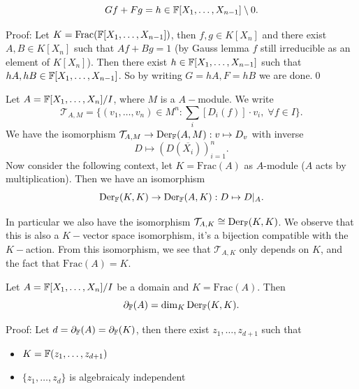 \begin{itemize}
\begin{corollary}
    \begin{equation}
        Gf + Fg = h\in \mathbb{F}[X_1,\dots,X_{n-1}]\setminus0.
    \end{equation}
  \end{corollary}
  Proof: Let $K=\text{Frac}(\mathbb{F}[X_1,\dots,X_{n-1}])$, then $f,g\in K[X_n]$ and there exist 
  $A,B\in K[X_n]$ such that $Af + Bg = 1$ (by Gauss lemma $f$ still irreducible as an element of 
  $K[X_n]$). Then there exist $h\in \mathbb{F}[X_1,\dots,X_{n-1}]$ such that 
  $hA, hB\in \mathbb{F}[X_1,\dots,X_{n-1}]$. So by writing $G=hA, F =hB$ we are done.\qed
  \begin{notation}
    Let $A=\mathbb{F}[X_1,\dots,X_n]/I$, where $M$ is a $A-$module. We write 
    \begin{equation}
        \mathcal{T}_{A,M}=\{(v_1,\dots,v_n)\in M^n:\sum_i[D_i(f)]\cdot v_i,\;\forall f\in I\}.
    \end{equation}
    We have the isomorphism $\mathcal{T}_{A,M}\to \text{Der}_{\mathbb{F}}(A,M): v\mapsto D_v$ with inverse 
    \begin{equation}
        D\mapsto (D(\overline{X_i}))_{i=1}^n.
    \end{equation}
    Now consider the following context, let 
    $K=\text{Frac}(A)$ as $A$-module ($A$ acts by multiplication). Then we have an isomorphism
    \begin{equation}
        \text{Der}_{\mathbb{F}}(K,K)\to \text{Der}_{\mathbb{F}}(A,K):D\mapsto D|_A.
    \end{equation}
  \end{notation}
  In particular we also have the isomorphism $\mathcal{T}_{A,K} \cong  \text{Der}_{\mathbb{F}}(K,K)$. We observe that 
  this is also a $K-$vector space isomorphism, it's a bijection compatible with the $K-$action. From this isomorphism, 
  we see that $\mathcal{T}_{A,K}$ only depends on $K$, and the fact that $\text{Frac}(A)=K$.
  \begin{theorem}
    Let $A=\mathbb{F}[X_1,\dots,X_n]/I$ be a domain and $K=\text{Frac}(A)$. Then 
    \begin{equation}
        \partial_{\mathbb{F}}(A) = \dim_{K}\text{Der}_{\mathbb{F}}(K,K).
    \end{equation} 
  \end{theorem}
  Proof: Let $d=\partial_{\mathbb{F}}(A)=\partial_{\mathbb{F}}(K)$, then there exist 
  $z_1,\dots, z_{d+1}$ such that 
  \begin{itemize}
    \item $K=\mathbb{F}(z_1,\dots, z_{d+1})$
    \item $\{z_1,\dots,z_d\}$ is algebraicaly independent

\end{itemize}
\end{itemize}
